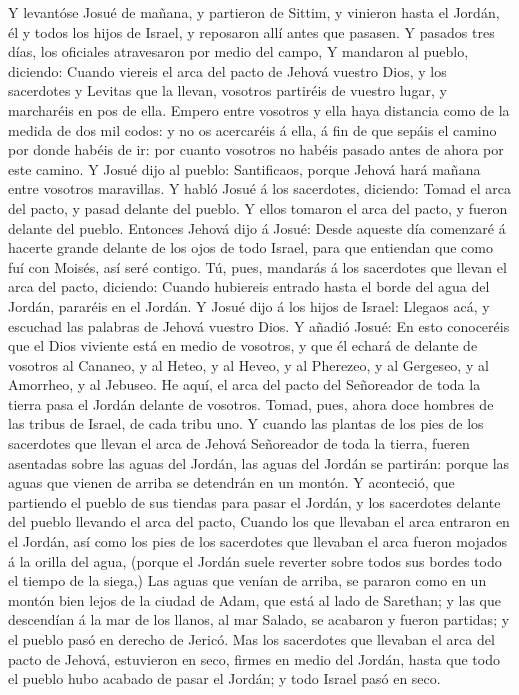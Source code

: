  Y levantóse Josué de mañana, y partieron de Sittim, y
vinieron hasta el Jordán, él y todos los hijos de Israel, y reposaron
allí antes que pasasen.  Y pasados tres días, los oficiales
atravesaron por medio del campo,  Y mandaron al pueblo,
diciendo: Cuando viereis el arca del pacto de Jehová vuestro Dios, y los
sacerdotes y Levitas que la llevan, vosotros partiréis de vuestro lugar,
y marcharéis en pos de ella.  Empero entre vosotros y ella
haya distancia como de la medida de dos mil codos: y no os acercaréis á
ella, á fin de que sepáis el camino por donde habéis de ir: por cuanto
vosotros no habéis pasado antes de ahora por este camino.  Y
Josué dijo al pueblo: Santificaos, porque Jehová hará mañana entre
vosotros maravillas.  Y habló Josué á los sacerdotes,
diciendo: Tomad el arca del pacto, y pasad delante del pueblo. Y ellos
tomaron el arca del pacto, y fueron delante del pueblo. 
Entonces Jehová dijo á Josué: Desde aqueste día comenzaré á hacerte
grande delante de los ojos de todo Israel, para que entiendan que como
fuí con Moisés, así seré contigo.  Tú, pues, mandarás á los
sacerdotes que llevan el arca del pacto, diciendo: Cuando hubiereis
entrado hasta el borde del agua del Jordán, pararéis en el Jordán.
 Y Josué dijo á los hijos de Israel: Llegaos acá, y escuchad
las palabras de Jehová vuestro Dios.  Y añadió Josué: En
esto conoceréis que el Dios viviente está en medio de vosotros, y que él
echará de delante de vosotros al Cananeo, y al Heteo, y al Heveo, y al
Pherezeo, y al Gergeseo, y al Amorrheo, y al Jebuseo.  He
aquí, el arca del pacto del Señoreador de toda la tierra pasa el Jordán
delante de vosotros.  Tomad, pues, ahora doce hombres de
las tribus de Israel, de cada tribu uno.  Y cuando las
plantas de los pies de los sacerdotes que llevan el arca de Jehová
Señoreador de toda la tierra, fueren asentadas sobre las aguas del
Jordán, las aguas del Jordán se partirán: porque las aguas que vienen de
arriba se detendrán en un montón.  Y aconteció, que
partiendo el pueblo de sus tiendas para pasar el Jordán, y los
sacerdotes delante del pueblo llevando el arca del pacto, 
Cuando los que llevaban el arca entraron en el Jordán, así como los pies
de los sacerdotes que llevaban el arca fueron mojados á la orilla del
agua, (porque el Jordán suele reverter sobre todos sus bordes todo el
tiempo de la siega,)  Las aguas que venían de arriba, se
pararon como en un montón bien lejos de la ciudad de Adam, que está al
lado de Sarethan; y las que descendían á la mar de los llanos, al mar
Salado, se acabaron y fueron partidas; y el pueblo pasó en derecho de
Jericó.  Mas los sacerdotes que llevaban el arca del pacto
de Jehová, estuvieron en seco, firmes en medio del Jordán, hasta que
todo el pueblo hubo acabado de pasar el Jordán; y todo Israel pasó en
seco.

